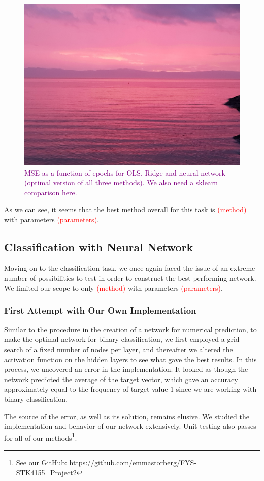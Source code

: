 \begin{figure}
    \centering
    \includegraphics[width=0.5\linewidth]{figures/placeholders/numericalprediction.png}
    \caption{\textcolor{purple}{MSE as a function of epochs for OLS, Ridge and neural network (optimal version of all three methods). We also need a sklearn comparison here.}}
    \label{fig:numericalprediction}
\end{figure}

As we can see, it seems that the best method overall for this task is \textcolor{red}{(method)} with parameters \textcolor{red}{(parameters)}. 

\subsection{Classification with Neural Network}
Moving on to the classification task, we once again faced the issue of an extreme number of possibilities to test in order to construct the best-performing network. We limited our scope to only \textcolor{red}{(method)} with parameters \textcolor{red}{(parameters)}.

\subsubsection{First Attempt with Our Own Implementation}
Similar to the procedure in the creation of a network for numerical prediction, to make the optimal network for binary classification, we first employed a grid search of a fixed number of nodes per layer, and thereafter we altered the activation function on the hidden layers to see what gave the best results. In this process, we uncovered an error in the implementation. It looked as though the network predicted the average of the target vector, which gave an accuracy approximately equal to the frequency of target value 1 since we are working with binary classification. 

The source of the error, as well as its solution, remains elusive. We studied the implementation and behavior of our network extensively. Unit testing also passes for all of our methods\footnote{See our GitHub: \url{https://github.com/emmastorberg/FYS-STK4155_Project2}}.  

